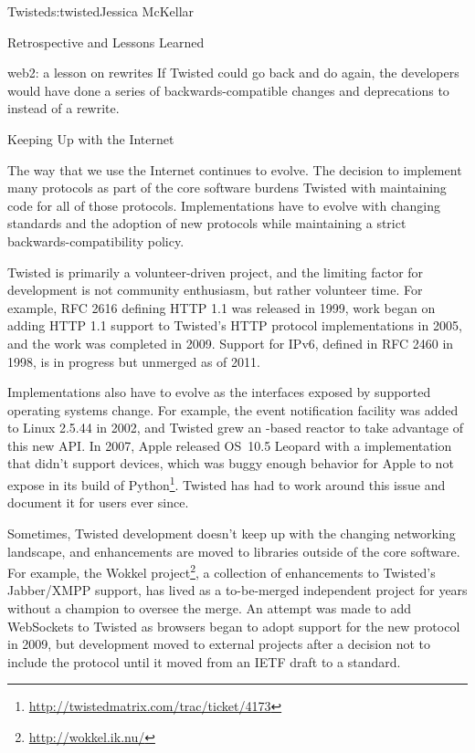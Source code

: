 \begin{aosachapter}{Twisted}{s:twisted}{Jessica McKellar}
\begin{aosasect1}{Retrospective and Lessons Learned}
\begin{aosasect2}{web2: a lesson on rewrites}
If Twisted could go back and do  again, the developers would
have done a series of backwards-compatible changes and deprecations to
 instead of a rewrite.

\end{aosasect2}

\begin{aosasect2}{Keeping Up with the Internet}

The way that we use the Internet continues to evolve. The decision to
implement many protocols as part of the core software burdens Twisted with
maintaining code for all of those protocols.  Implementations have to evolve
with changing standards and the adoption of new protocols while maintaining a
strict backwards-compatibility policy.

Twisted is primarily a volunteer-driven project, and the limiting factor for
development is not community enthusiasm, but rather volunteer time. For example,
RFC 2616 defining HTTP 1.1 was released in 1999, work began on adding HTTP 1.1
support to Twisted's HTTP protocol implementations in 2005, and the work was
completed in 2009.  Support for IPv6, defined in RFC 2460 in 1998, is in
progress but unmerged as of 2011.

Implementations also have to evolve as the interfaces exposed by
supported operating systems change. For example, the 
event notification facility was added to Linux 2.5.44 in 2002, and
Twisted grew an -based reactor to take advantage of this new
API. In 2007, Apple released OS~10.5 Leopard with a 
implementation that didn't support devices, which was buggy enough
behavior for Apple to not expose  in its build of
Python\footnote{\url{http://twistedmatrix.com/trac/ticket/4173}}.
Twisted has had to work around this issue and document it for users
ever since.

Sometimes, Twisted development doesn't keep up with the changing networking
landscape, and enhancements are moved to libraries outside of the core
software. For example, the Wokkel project\footnote{\url{http://wokkel.ik.nu/}}, a collection of enhancements to
Twisted's Jabber/XMPP support, has lived as a to-be-merged independent project
for years without a champion to oversee the merge. An attempt was made to
add WebSockets to Twisted as browsers began to adopt support for the new
protocol in 2009, but development moved to external projects after a decision
not to include the protocol until it moved from an IETF draft to a standard.


\end{aosasect2}
\end{aosasect1}
\end{aosachapter}
